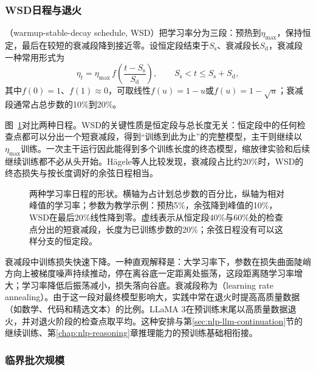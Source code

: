 \subsubsection{WSD日程与退火}
\label{sec:nlp-llm-wsd}

（warmup-stable-decay schedule, WSD）把学习率分为三段：预热到$\eta_{\max}$，保持恒定，最后在较短的衰减段降到接近零。设恒定段结束于$S_{\mathrm s}$、衰减段长$S_{\mathrm d}$，衰减段一种常用形式为
\begin{equation}
 \eta_t=\eta_{\max}\,f\!\left(\frac{t-S_{\mathrm s}}{S_{\mathrm d}}\right),\qquad
 S_{\mathrm s}<t\leq S_{\mathrm s}+S_{\mathrm d},
 \label{eq:nlp-llm-wsd}
\end{equation}
其中$f(0)=1$、$f(1)\approx0$，可取线性$f(u)=1-u$或$f(u)=1-\sqrt u$；衰减段通常占总步数的10\%到20\%。

图~\ref{fig:nlp-llm-lr-schedules}对比两种日程。WSD的关键性质是恒定段与总长度无关：恒定段中的任何检查点都可以分出一个短衰减段，得到“训练到此为止”的完整模型，主干则继续以$\eta_{\max}$训练。一次主干运行因此能得到多个训练长度的终态模型，缩放律实验和后续继续训练都不必从头开始。Hägele等人比较发现，衰减段占比约20\%时，WSD的终态损失与按长度调好的余弦日程相当。

\begin{figure}[htbp]
  \centering
  
  \caption{两种学习率日程的形状。横轴为占计划总步数的百分比，纵轴为相对峰值的学习率；参数为教学示例：预热5\%，余弦降到峰值的10\%，WSD在最后20\%线性降到零。虚线表示从恒定段40\%与60\%处的检查点分出的短衰减段，长度为已训练步数的20\%；余弦日程没有可以这样分支的恒定段。}
  \label{fig:nlp-llm-lr-schedules}
\end{figure}

衰减段中训练损失快速下降。一种直观解释是：大学习率下，参数在损失曲面陡峭方向上被梯度噪声持续推动，停在离谷底一定距离处振荡，这段距离随学习率增大；学习率降低后振荡减小，损失落向谷底。衰减段称为（learning rate annealing）。由于这一段对最终模型影响大，实践中常在退火时提高高质量数据（如数学、代码和精选文本）的比例。LLaMA 3在预训练末尾以高质量数据退火，并对退火阶段的检查点取平均。这种安排与第\ref{sec:nlp-llm-continuation}节的继续训练、第\ref{chap:nlp-reasoning}章推理能力的预训练基础相衔接。

\subsubsection{临界批次规模}
\label{sec:nlp-llm-critical-batch}

